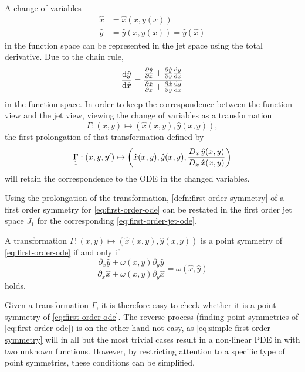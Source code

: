 A change of variables
\begin{align*}
  \hat{x} &= \hat{x}(x, y(x))\\
  \hat{y} &= \hat{y}(x, y(x)) = \hat{y}(\hat{x})
\end{align*}
in the function space can be represented in the jet space using the total derivative.
Due to the chain rule,
\begin{equation*}
  \diff{\hat{y}}{\hat{x}} = 
  \frac{\diffp{\hat{y}}{x} + \diffp{\hat{y}}{y} \diff{y}{x}}{\diffp{\hat{x}}{x} + \diffp{\hat{x}}{y} \diff{y}{x}}
\end{equation*}
in the function space.
In order to keep the correspondence between the function view and the jet view, viewing the change of variables as a transformation
\begin{equation*}
  \Gamma: \left(x,y\right) \mapsto \left(\hat{x}(x,y), \hat{y}(x,y)\right),
\end{equation*}
the first prolongation of that transformation defined by
\begin{equation*}
  \prolong{\Gamma}{1}: \left(x,y,y'\right) \mapsto \left(\hat{x}(x,y), \hat{y}(x,y), \frac{\tD{x} \hat{y}(x,y)}{\tD{x} \hat{x}(x,y)}\right)
\end{equation*}
will retain the correspondence to the ODE in the changed variables.

Using the prolongation of the transformation, \cref{defn:first-order-symmetry} of a first order symmetry for \cref{eq:first-order-ode} can be restated in the first order jet space \(J_1\) for the corresponding \cref{eq:first-order-jet-ode}.
\begin{lem} \label{lem:simple-first-order-symmetry}
  A transformation \(\Gamma: \left(x,y\right) \mapsto \left(\hat{x}(x,y), \hat{y}(x,y)\right)\) is a point symmetry of \cref{eq:first-order-ode} if and only if
  \begin{equation} \label{eq:simple-first-order-symmetry}
    \frac{\partial_x \hat{y} + \omega(x,y) \partial_y \hat{y}}{\partial_x \hat{x} + \omega(x,y) \partial_y \hat{x}} = \omega(\hat{x},\hat{y})
  \end{equation}
  holds.
\end{lem} %
Given a transformation \(\Gamma\), it is therefore easy to check whether it is a point symmetry of \cref{eq:first-order-ode}.
The reverse process (finding point symmetries of \cref{eq:first-order-ode}) is on the other hand not easy, as \cref{eq:simple-first-order-symmetry} will in all but the most trivial cases result in a non-linear PDE in with two unknown functions.
However, by restricting attention to a specific type of point symmetries, these conditions can be simplified.


